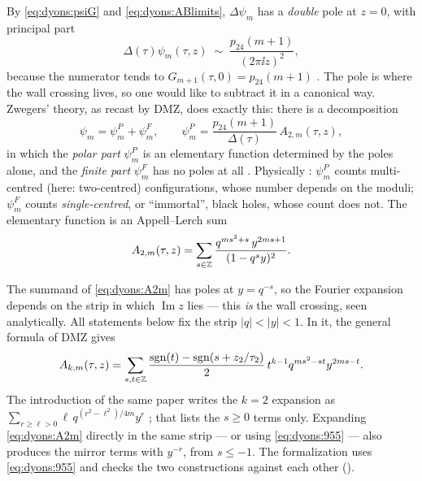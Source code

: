 By \eqref{eq:dyons:psiG} and \eqref{eq:dyons:ABlimits}, $\Delta\psi_m$ has a \emph{double} pole
at $z=0$, with principal part
\begin{equation}\label{eq:dyons:principal}
  \Delta(\tau)\psi_m(\tau,z)\;\sim\;\frac{p_{24}(m+1)}{(2\pi\ii z)^{2}} ,
\end{equation}
because the numerator tends to $G_{m+1}(\tau,0)=p_{24}(m+1)$ .
The pole is where the wall crossing lives, so one would like to subtract it in a canonical way.
Zwegers' theory, as recast by DMZ, does exactly this: there is a decomposition
\begin{equation}\label{eq:dyons:decomp}
  \psi_m=\psi^{P}_m+\psi^{F}_m,
  \qquad
  \psi^{P}_m=\frac{p_{24}(m+1)}{\Delta(\tau)}\,A_{2,m}(\tau,z),
\end{equation}
in which the \emph{polar part} $\psi^P_m$ is an elementary function determined by the poles
alone, and the \emph{finite part} $\psi^F_m$ has no poles at all
. Physically : $\psi^P_m$ counts
multi-centred (here: two-centred) configurations, whose number depends on the moduli;
$\psi^F_m$ counts \emph{single-centred}, or ``immortal'', black holes, whose count does not.
The elementary function is an Appell--Lerch sum
\begin{equation}\label{eq:dyons:A2m}
  A_{2,m}(\tau,z)=\sum_{s\in\mathbb{Z}}\frac{q^{ms^2+s}\,y^{2ms+1}}{(1-q^sy)^2}.
\end{equation}

\begin{pitfallbox}
The summand of \eqref{eq:dyons:A2m} has poles at $y=q^{-s}$, so the Fourier expansion depends
on the strip in which $\operatorname{Im}z$ lies --- this \emph{is} the wall crossing, seen
analytically. All statements below fix the strip $|q|<|y|<1$. In it, the general formula of DMZ
 gives
\begin{equation}\label{eq:dyons:955}
  A_{k,m}(\tau,z)=\sum_{s,t\in\mathbb{Z}}\frac{\operatorname{sgn}(t)-\operatorname{sgn}(s+z_2/\tau_2)}{2}\,
  t^{k-1}q^{ms^2-st}y^{2ms-t}.
\end{equation}
The introduction of the same paper writes the $k=2$ expansion as
$\sum_{r\ge\ell>0}\ell\,q^{(r^2-\ell^2)/4m}y^{r}$ ; that lists
the $s\ge0$ terms only. Expanding \eqref{eq:dyons:A2m} directly in the same strip --- or using
\eqref{eq:dyons:955} --- also produces the mirror terms with $y^{-r}$, from $s\le-1$. The
formalization uses \eqref{eq:dyons:955} and checks the two constructions against each other
().
\end{pitfallbox}


